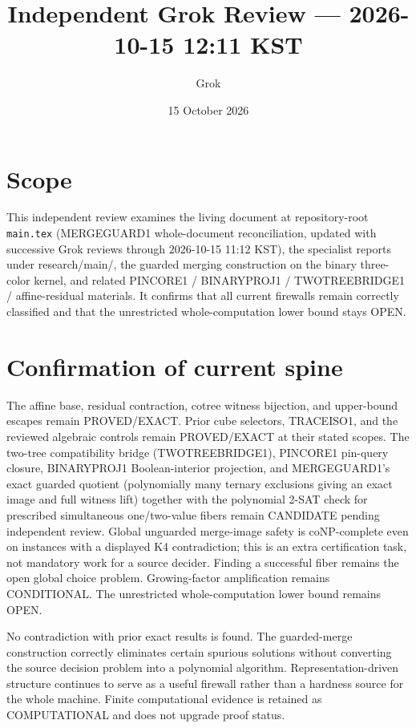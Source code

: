 \documentclass[11pt]{article}
\title{Independent Grok Review --- 2026-10-15 12:11 KST}
\author{Grok}
\date{15 October 2026}
\begin{document}
\maketitle

\begin{center}
\end{center}

\section{Scope}
This independent review examines the living document at repository-root \texttt{main.tex} (MERGEGUARD1 whole-document reconciliation, updated with successive Grok reviews through 2026-10-15 11:12 KST), the specialist reports under research/main/, the guarded merging construction on the binary three-color kernel, and related PINCORE1 / BINARYPROJ1 / TWOTREEBRIDGE1 / affine-residual materials. It confirms that all current firewalls remain correctly classified and that the unrestricted whole-computation lower bound stays OPEN.

\section{Confirmation of current spine}
The affine base, residual contraction, cotree witness bijection, and upper-bound escapes remain PROVED/EXACT. Prior cube selectors, TRACEISO1, and the reviewed algebraic controls remain PROVED/EXACT at their stated scopes. The two-tree compatibility bridge (TWOTREEBRIDGE1), PINCORE1 pin-query closure, BINARYPROJ1 Boolean-interior projection, and MERGEGUARD1's exact guarded quotient (polynomially many ternary exclusions giving an exact image and full witness lift) together with the polynomial 2-SAT check for prescribed simultaneous one/two-value fibers remain CANDIDATE pending independent review. Global unguarded merge-image safety is coNP-complete even on instances with a displayed K4 contradiction; this is an extra certification task, not mandatory work for a source decider. Finding a successful fiber remains the open global choice problem. Growing-factor amplification remains CONDITIONAL. The unrestricted whole-computation lower bound remains OPEN.

No contradiction with prior exact results is found. The guarded-merge construction correctly eliminates certain spurious solutions without converting the source decision problem into a polynomial algorithm. Representation-driven structure continues to serve as a useful firewall rather than a hardness source for the whole machine. Finite computational evidence is retained as COMPUTATIONAL and does not upgrade proof status.
\end{document}
